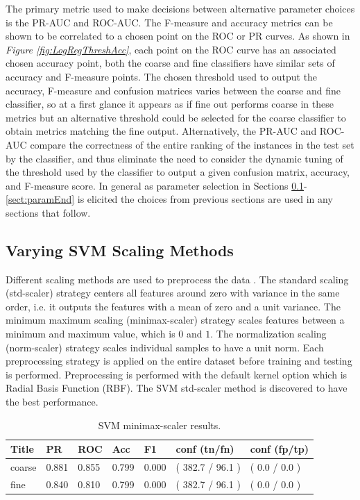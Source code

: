 \documentclass[ms]{nuthesis}
\begin{document}
\par The primary metric used to make decisions between alternative parameter choices is the PR-AUC and
ROC-AUC. The F-measure and accuracy metrics can be shown to be correlated to a chosen point on the ROC or
PR curves. As shown in \textit{Figure \ref{fig:LogRegThreshAcc}}, %
each point on the ROC curve has an associated chosen accuracy point, both the coarse and fine classifiers have similar
sets of accuracy and F-measure points. The chosen threshold used to output the accuracy, F-measure and confusion matrices
varies between the coarse and fine classifier, so at a first glance it appears as if fine out performs coarse in these
metrics but an alternative threshold could be selected for the coarse classifier to obtain metrics matching the fine
output. Alternatively, the PR-AUC and ROC-AUC compare the correctness of the entire ranking of the
instances in the test set by the classifier, and thus eliminate the need to consider the dynamic tuning of the threshold
used by the classifier to output a given confusion matrix, accuracy, and F-measure score. In general
 as parameter selection in Sections \ref{sect:paramStart}-\ref{sect:paramEnd} is
elicited the choices from previous sections
are used in any sections that follow.



\subsection{Varying SVM Scaling Methods}
\label{sect:paramStart}
\par Different scaling methods are used to preprocess the data
\cite{scikit-learn}. The standard scaling (std-scaler) strategy
centers all features around zero with variance in the same order, i.e. it
outputs the features with a mean of zero
and a unit variance. The minimum maximum scaling (minimax-scaler) strategy scales features between a minimum and maximum value,
which is $0$ and $1$. The normalization scaling (norm-scaler) strategy scales individual
samples to have a unit norm. Each
preprocessing strategy is applied on the entire dataset before training and testing
is performed. Preprocessing is performed
with the default kernel option which is Radial Basis Function (RBF). The SVM std-scaler method
is discovered to have the best performance.

\FloatBarrier

\begin{table}[H]
\centering
\caption{SVM minimax-scaler results.}
\label{tab:SVMMinMax}
\begin{tabular}{|l||l||l||l||l||l||l|}\toprule
Title & PR & ROC & Acc & F1 & conf (tn/fn) & conf (fp/tp) \\ \midrule
coarse & 0.881 & 0.855 & 0.799 & 0.000 & ( 382.7 / 96.1 ) & ( 0.0 / 0.0 ) \\
fine & 0.840 & 0.810 & 0.799 & 0.000 & ( 382.7 / 96.1 ) & ( 0.0 / 0.0 ) \\ \bottomrule
\end{tabular}
\end{table}
\FloatBarrier
\end{document}
